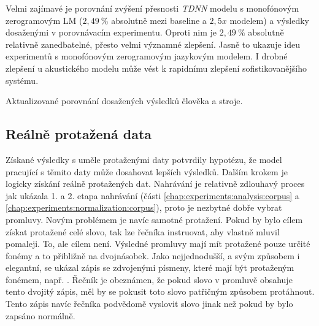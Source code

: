 Velmi zajímavé je porovnání zvýšení přesnosti \textit{TDNN} modelu s monofónovým zerogramovým LM ($2,49\ \%$ absolutně mezi baseline a $2,5x$ modelem) a výsledky dosaženými v porovnávacím experimentu. Oproti nim je $2,49\ \%$ absolutně relativně zanedbatelné, přesto velmi významné zlepšení. Jasně to ukazuje ideu experimentů s monofónovým zerogramovým jazykovým modelem. I drobné zlepšení u akustického modelu může vést k rapidnímu zlepšení sofistikovanějšího systému.

\begin{table}[htpb]
  \centering
  \def\arraystretch{1.5}
  \caption{Aktualizované porovnání dosažených výsledků člověka a stroje.}
  \label{tab:experiments:augmentation:comparison}
\end{table}


\subsection{Reálně protažená data}
\label{chap:realisation:augmentation:real}

Získané výsledky s uměle protaženými daty potvrdily hypotézu, že model pracující s těmito daty může dosahovat lepších výsledků. Dalším krokem je logicky získání reálně protažených dat. Nahrávání je relativně zdlouhavý proces jak ukázala 1. a 2. etapa nahrávání (části \ref{chap:experiments:analysis:corpus} a \ref{chap:experiments:normalization:corpus}), proto je nezbytné dobře vybrat promluvy. Novým problémem je navíc samotné protažení. Pokud by bylo cílem získat protažené celé slovo, tak lze řečníka instruovat, aby vlastně mluvil pomaleji. To, ale cílem není. Výsledné promluvy mají mít protažené pouze určité fonémy a to přibližně na dvojnásobek. Jako nejjednodušší, a svým způsobem i elegantní, se ukázal zápis se zdvojenými písmeny, které mají být protaženým fonémem, např. . Řečník je obeznámen, že pokud slovo v promluvě obsahuje tento dvojitý zápis, měl by se pokusit toto slovo patřičným způsobem protáhnout. Tento zápis navíc řečníka podvědomě  vyslovit slovo jinak než pokud by bylo zapsáno normálně.

